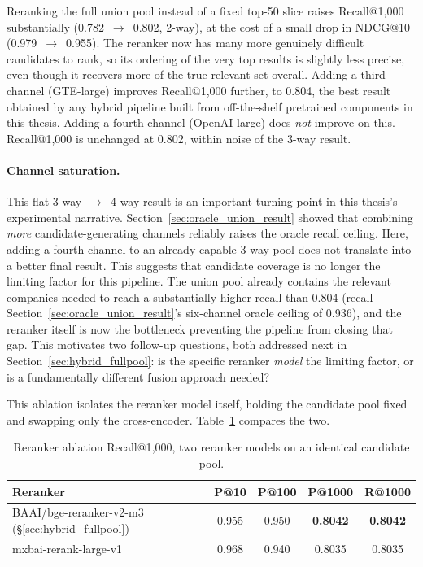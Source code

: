 \documentclass[a4paper,oneside,bibliography=totoc]{scrbook}
\begin{document}
Reranking the full union pool instead of a fixed top-50 slice raises Recall@1{,}000 substantially (0.782~$\to$~0.802, 2-way), at the cost of a small drop in NDCG@10 (0.979~$\to$~0.955). The reranker now has many more genuinely difficult candidates to rank, so its ordering of the very top results is slightly less precise, even though it recovers more of the true relevant set overall. Adding a third channel (GTE-large) improves Recall@1{,}000 further, to 0.804, the best result obtained by any hybrid pipeline built from off-the-shelf pretrained components in this thesis. Adding a fourth channel (OpenAI-large) does \emph{not} improve on this. Recall@1{,}000 is unchanged at 0.802, within noise of the 3-way result.

\paragraph{Channel saturation.} This flat 3-way~$\to$~4-way result is an important turning point in this thesis's experimental narrative. Section~\ref{sec:oracle_union_result} showed that combining \emph{more} candidate-generating channels reliably raises the oracle recall ceiling. Here, adding a fourth channel to an already capable 3-way pool does not translate into a better final result. This suggests that candidate coverage is no longer the limiting factor for this pipeline. The union pool already contains the relevant companies needed to reach a substantially higher recall than 0.804 (recall Section~\ref{sec:oracle_union_result}'s six-channel oracle ceiling of 0.936), and the reranker itself is now the bottleneck preventing the pipeline from closing that gap. This motivates two follow-up questions, both addressed next in Section~\ref{sec:hybrid_fullpool}: is the specific reranker \emph{model} the limiting factor, or is a fundamentally different fusion approach needed?

\label{sec:reranker_ablation_result}

This ablation isolates the reranker model itself, holding the candidate pool fixed and swapping only the cross-encoder. Table~\ref{tab:reranker_ablation} compares the two.

\begin{table}[ht]
\centering
\caption{Reranker ablation Recall@1{,}000, two reranker models on an identical candidate pool.}
\label{tab:reranker_ablation}
\small
\setlength{\tabcolsep}{2.5pt}
\begin{tabular}{lcccc}
\toprule
\textbf{Reranker} & \textbf{P@10} & \textbf{P@100} & \textbf{P@1000} & \textbf{R@1000} \\
\midrule
BAAI/bge-reranker-v2-m3 (\S\ref{sec:hybrid_fullpool}) & 0.955 & 0.950 & \textbf{0.8042} & \textbf{0.8042} \\
mxbai-rerank-large-v1                                 & 0.968 & 0.940 & 0.8035          & 0.8035 \\
\bottomrule
\end{tabular}
\normalsize
\end{table}
\end{document}

